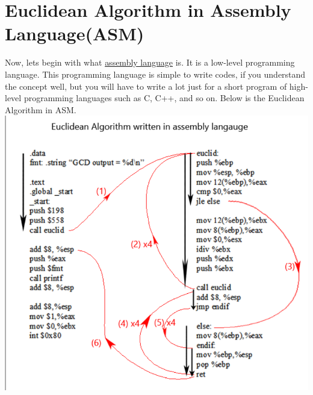 \documentclass{article}
\begin{document}
\section*{Euclidean Algorithm in Assembly Language(ASM)}
Now, lets begin with what \href{https://goo.gl/4S1vKl}{assembly language} is. It is a low-level programming language. This programming language is simple to write codes, if you understand the concept well, but you will have to write a lot just for a short program of high-level programming languages such as C, C++, and so on. Below is the Euclidean Algorithm in ASM.\\
\includegraphics[scale=0.4]{euclidasm.PNG}
\clearpage
\end{document}
